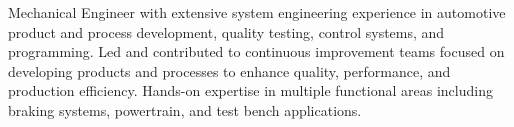 

\begin{cvparagraph}

Mechanical Engineer with extensive system engineering experience in automotive product and process development, quality testing, control systems, and programming. Led and contributed to continuous improvement teams focused on developing products and processes to enhance quality, performance, and production efficiency. Hands-on expertise in multiple functional areas including braking systems, powertrain, and test bench applications.
\end{cvparagraph}